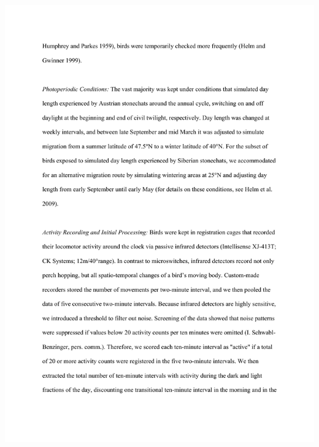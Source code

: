 \documentclass[a4paper, twoside]{templates/ociamthesis}
\begin{document}
\includegraphics[width=1\linewidth]{pdf_chapters/zug/zug_supp_crop_Part03}
\end{document}
